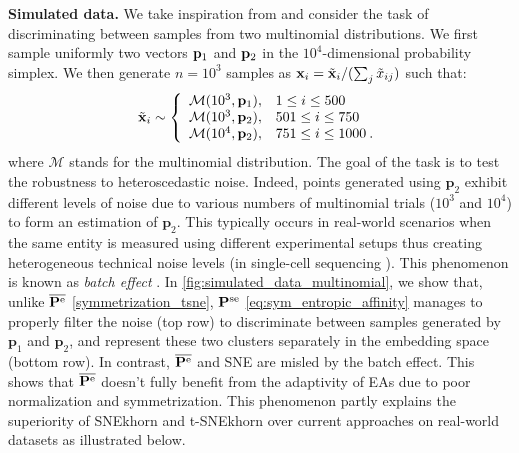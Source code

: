 \textbf{Simulated data.}
We take inspiration from \citep{landa2021doubly} and consider the task of discriminating between samples from two multinomial distributions. We first sample uniformly two vectors $\mathbf{p}_1$ and $\mathbf{p}_2$ in the $10^4$-dimensional probability simplex. We then generate $n=10^3$ samples as $\mathbf{x}_i =\tilde{\mathbf{x}}_i / (\sum_j \tilde{x}_{ij})$ such that:
\begin{align*}
    \tilde{\mathbf{x}}_i \sim 
    \left\{
    \begin{array}{ll}
        \mathcal{M}(10^3, \mathbf{p}_1), & 1\leq i \leq 500 \\
        \mathcal{M}(10^3, \mathbf{p}_2), & 501\leq i \leq 750 \\
        \mathcal{M}(10^4, \mathbf{p}_2), & 751\leq i \leq 1000 \:.
    \end{array}
    \right.
\end{align*}
where $\mathcal{M}$ stands for the multinomial distribution. 
The goal of the task is to test the robustness to heteroscedastic noise. Indeed, points generated using $\mathbf{p}_2$ exhibit different levels of noise due to various numbers of multinomial trials ($10^3$ and $10^4$) to form an estimation of $\mathbf{p}_2$. This typically occurs in real-world scenarios when the same entity is measured using different experimental setups thus creating heterogeneous technical noise levels (\eg in single-cell sequencing \citep{kobak2019art}). This phenomenon is known as \emph{batch effect} \citep{tran2020benchmark}.
In \cref{fig:simulated_data_multinomial}, we show that, unlike $\overline{\mathbf{P}^{\mathrm{e}}}$ \eqref{symmetrization_tsne}, $\mathbf{P}^{\mathrm{se}}$ \eqref{eq:sym_entropic_affinity} manages to properly filter the noise (top row) to discriminate between samples generated by $\mathbf{p}_1$ and $\mathbf{p}_2$, and represent these two clusters separately in the embedding space (bottom row). In contrast, $\overline{\mathbf{P}^{\mathrm{e}}}$ and SNE are misled by the batch effect. This shows that $\overline{\mathbf{P}^{\mathrm{e}}}$ doesn't fully benefit from the adaptivity of EAs due to poor normalization and symmetrization. This phenomenon partly explains the superiority of SNEkhorn and t-SNEkhorn over current approaches on real-world datasets as illustrated below. 

